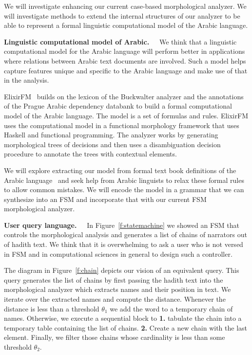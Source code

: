 \documentclass[12pt]{article}
\begin{document}
We will investigate enhancing our current case-based morphological
analyzer.
We will investigate methods to extend the internal structures 
of our analyzer to be able to represent a formal linguistic
computational model of the Arabic language. 

{\bf Linguistic computational model of Arabic.~~}
We think that a linguistic computational model for the Arabic
language will perform better in applications where
relations between Arabic text documents are involved. 
Such a model helps capture features unique and specific 
to the Arabic language and make use of that in the analysis.

ElixirFM~\cite{Otakar:07} builds on the lexicon
of the Buckwalter analyzer and the annotations of the 
Prague Arabic dependency databank to build a formal 
computational model of the Arabic language.
The model is a set of formulas and rules. 
ElixirFM uses the computational model in a functional
morphology framework that uses Haskell and functional
programming. 
The analyzer works by generating morphological trees of 
decisions and then uses a disambiguation decision procedure 
to annotate the trees with contextual elements. 

We will explore extracting our model from formal text book
definitions of the Arabic language~\cite{Abd00,Abd001} and seek
help from Arabic linguists to relax these formal rules to
allow common mistakes. 
We will encode the model in a grammar that we can synthesize
into an FSM and incorporate that with our current FSM 
morphological analyzer. 


{\bf User query language.~~}
In Figure~\ref{f:statemachine} we showed an FSM 
that controls the morphological analysis and generates a
list of chains of narrators out of hadith text.
We think that it is overwhelming to ask a user who is not 
versed in FSM and in computational sciences in general 
to design such a controller. 

The diagram in Figure~\ref{f:chain} depicts our vision of 
an equivalent query.
This query generates the list of chains by first passing the 
hadith text into the morphological analyzer which 
extracts names and their position in text. 
We iterate over the extracted names and compute the distance.
Whenever the distance is less than a threshold $\theta_1$
we add the word to a temporary chain of names. 
Otherwise, we execute a sequential block to 
{\bf 1.} tabulate the chain into a temporary table containing 
the list of chains. 
{\bf 2.} Create a new chain with the last element.
Finally, we filter those chains whose cardinality 
is less than some threshold  $\theta_2$.
\end{document}
